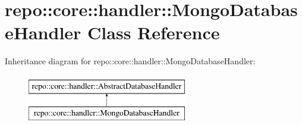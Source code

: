 \hypertarget{classrepo_1_1core_1_1handler_1_1_mongo_database_handler}{}\section{repo\+:\+:core\+:\+:handler\+:\+:Mongo\+Database\+Handler Class Reference}
\label{classrepo_1_1core_1_1handler_1_1_mongo_database_handler}
Inheritance diagram for repo\+:\+:core\+:\+:handler\+:\+:Mongo\+Database\+Handler\+:\begin{figure}[H]
\begin{center}
\leavevmode
\includegraphics[height=2.000000cm]{classrepo_1_1core_1_1handler_1_1_mongo_database_handler}
\end{center}
\end{figure}
